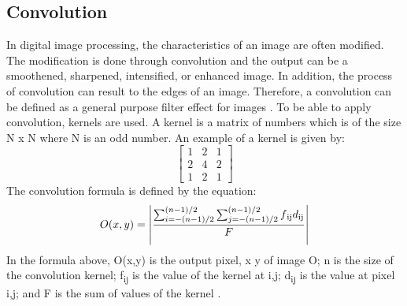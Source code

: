 \documentclass[journal]{./IEEE/IEEEtran}
\begin{document}
\subsection{Convolution}
In digital image processing, the characteristics of an image are often modified. The modification is done through convolution and the output can be a smoothened, sharpened, intensified, or enhanced image. In addition, the process of convolution can result to the edges of an image. Therefore, a convolution can be defined as a general purpose filter effect for images \cite{Ludwig2007}. To be able to apply convolution, kernels are used. A kernel is a matrix of numbers which is of the size N x N where N is an odd number. An example of a kernel is given by:
\newline
\begin{equation}
\begin{bmatrix}
1&2&1\\ 
2&4&2\\ 
1&2&1 
\end{bmatrix}
\end{equation}
\newline
\indent The convolution formula is defined by the equation:
\newline
\begin{equation}
O(x,y) = \left | \frac{\sum_{i=-(n-1)/2}^{(n-1)/2} \sum_{j=-(n-1)/2}^{(n-1)/2}f\textsubscript{ij}d\textsubscript{ij}}{F} \right |
\end{equation}
\newline
\indent In the formula above, O(x,y) is the output pixel, x y of image O; n is the size of the convolution kernel; f\textsubscript{ij} is the value of the kernel at i,j; d\textsubscript{ij} is the value at pixel i,j; and F is the sum of values of the kernel \cite{AbriolSantos22018}.
\end{document}
